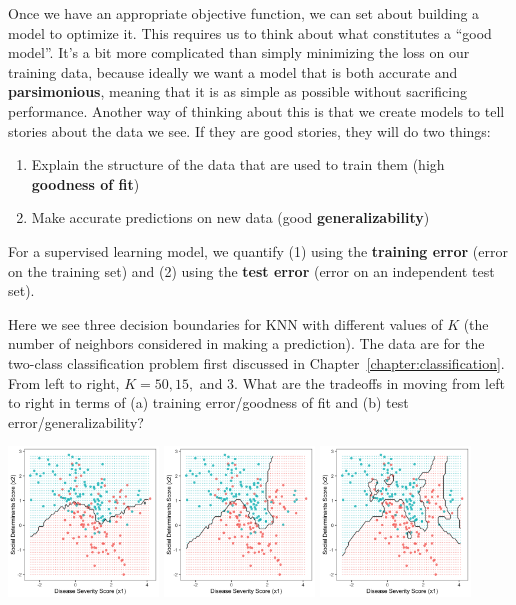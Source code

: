 Once we have an appropriate objective function, we can set about building a model to optimize it. This requires us to think about what constitutes a ``good model''. It's a bit more complicated than simply minimizing the loss on our training data, because ideally we want a model that is both accurate and \textbf{parsimonious}, meaning that it is as simple as possible without sacrificing performance. Another way of thinking about this is that we create models to tell stories about the data we see. If they are good stories, they will do two things:
\begin{enumerate}
\item Explain the structure of the data that are used to train them (high \textbf{goodness of fit})
\item Make accurate predictions on new data (good \textbf{generalizability}) 
\end{enumerate}
For a supervised learning model, we quantify (1) using the \textbf{training error} (error on the training set) and (2) using the \textbf{test error} (error on an independent test set).

\vspace{2mm}

\begin{question}{}
Here we see three decision boundaries for KNN with different values of $K$ (the number of neighbors considered in making a prediction). The data are for the two-class classification problem first discussed in Chapter~\ref{chapter:classification}. From left to right, $K=50, 15,$ and $3$. What are the tradeoffs in moving from left to right in terms of (a) training error/goodness of fit and (b) test error/generalizability? 
\begin{center}
\includegraphics[width=0.3\textwidth]{img/esl-knn-50.png}
\includegraphics[width=0.3\textwidth]{img/esl-knn-15.png}
\includegraphics[width=0.3\textwidth]{img/esl-knn-3.png}
\end{center}
\end{question}

